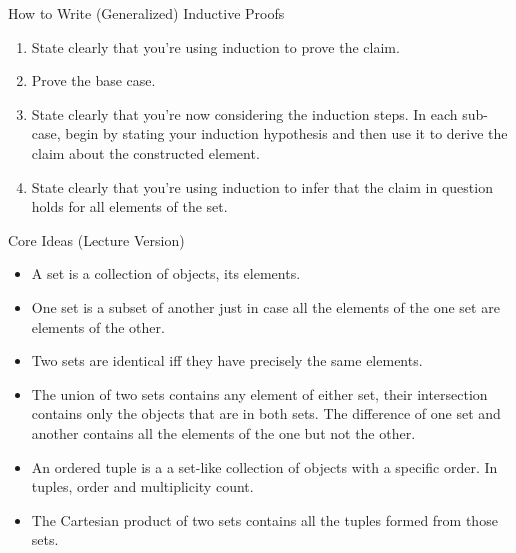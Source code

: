 \begin{frame}{How to Write (Generalized) Inductive Proofs}


	\begin{enumerate}[1.]
		
			\item State clearly that you're using induction to prove the claim.
			
			\item Prove the base case. 
			
			\item State clearly that you're now considering the induction steps. In each sub-case, begin by stating your induction hypothesis and then use it to derive the claim about the constructed element.
			
			\item State clearly that you're using induction to infer that the claim in question holds for all elements of the set.
		
		\end{enumerate}
		

\end{frame}

\begin{frame}{Core Ideas (Lecture Version)}
	
\begin{itemize}

		\item A set is a collection of objects, its elements.
		
		\item One set is a subset of another just in case all the elements of the one set are elements of the other. 
				
		\item Two sets are identical iff they have precisely the same elements. 
		
		\item The union of two sets contains any element of either set, their intersection contains only the objects that are in both sets. The difference of one set and another contains all the elements of the one but not the other.
		
		\item An ordered tuple is a a set-like collection of objects with a specific order. In tuples, order and multiplicity count.
		
		\item The Cartesian product of two sets contains all the tuples formed from those sets.
		
		\end{itemize}
		
	\end{frame}
		
